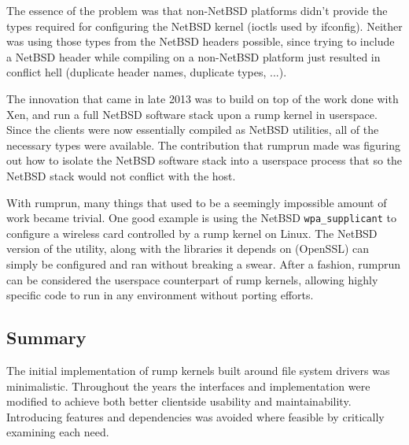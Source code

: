 The essence of the problem was that non-NetBSD platforms didn't provide
the types required for configuring the NetBSD kernel (\eg ioctls used
by ifconfig).  Neither was using those types from the NetBSD headers
possible, since trying to include a NetBSD header while compiling on
a non-NetBSD platform just resulted in conflict hell (duplicate header
names, duplicate types, ...).

The innovation that came in late 2013 was to build on top of the work
done with Xen, and run a full NetBSD software stack upon a rump kernel
in userspace.  Since the clients were now essentially compiled as NetBSD
utilities, all of the necessary types were available.  The contribution
that rumprun made was figuring out how to isolate the NetBSD software
stack into a userspace process that so the NetBSD stack would not conflict
with the host.

With rumprun, many things that used to be a seemingly impossible
amount of work became trivial.  One good example is using the NetBSD
\verb+wpa_supplicant+ to configure a wireless card controlled by a rump
kernel on Linux.  The NetBSD version of the utility, along with the
libraries it depends on (\eg OpenSSL) can simply be configured and ran
without breaking a swear.  After a fashion, rumprun can be considered
the userspace counterpart of rump kernels, allowing highly specific code
to run in any environment without porting efforts.


\subsection{Summary}

The initial implementation of rump kernels built around file system
drivers was minimalistic.  Throughout the years the interfaces and
implementation were modified to achieve both better clientside usability
and maintainability.  Introducing features and dependencies was avoided
where feasible by critically examining each need.
